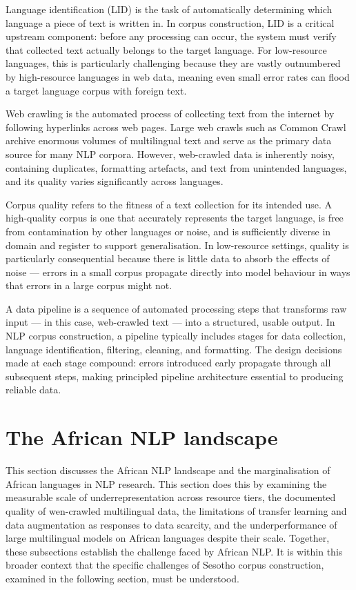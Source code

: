 \documentclass[11pt,a4paper]{article}
\begin{document}
Language identification (LID) is the task of automatically determining which language a piece of text is written in. In corpus construction, LID is a critical upstream component: before any processing can occur, the system must verify that collected text actually belongs to the target language. For low-resource languages, this is particularly challenging because they are vastly outnumbered by high-resource languages in web data, meaning even small error rates can flood a target language corpus with foreign text.

Web crawling is the automated process of collecting text from the internet by following hyperlinks across web pages. Large web crawls such as Common Crawl archive enormous volumes of multilingual text and serve as the primary data source for many NLP corpora. However, web-crawled data is inherently noisy, containing duplicates, formatting artefacts, and text from unintended languages, and its quality varies significantly across languages.

Corpus quality refers to the fitness of a text collection for its intended use. A high-quality corpus is one that accurately represents the target language, is free from contamination by other languages or noise, and is sufficiently diverse in domain and register to support generalisation. In low-resource settings, quality is particularly consequential because there is little data to absorb the effects of noise — errors in a small corpus propagate directly into model behaviour in ways that errors in a large corpus might not.

A data pipeline is a sequence of automated processing steps that transforms raw input — in this case, web-crawled text — into a structured, usable output. In NLP corpus construction, a pipeline typically includes stages for data collection, language identification, filtering, cleaning, and formatting. The design decisions made at each stage compound: errors introduced early propagate through all subsequent steps, making principled pipeline architecture essential to producing reliable data.

\clearpage
\section{The African NLP landscape}
This section discusses the African NLP landscape and the marginalisation of African languages in NLP research. This section does this by examining the measurable scale of underrepresentation across resource tiers, the documented quality of wen-crawled multilingual data, the limitations of transfer learning and data augmentation as responses to data scarcity, and the underperformance of large multilingual models on African languages despite their scale. Together, these subsections establish the challenge faced by African NLP. It is within this broader context that the specific challenges of Sesotho corpus construction, examined in the following section, must be understood.
\end{document}
